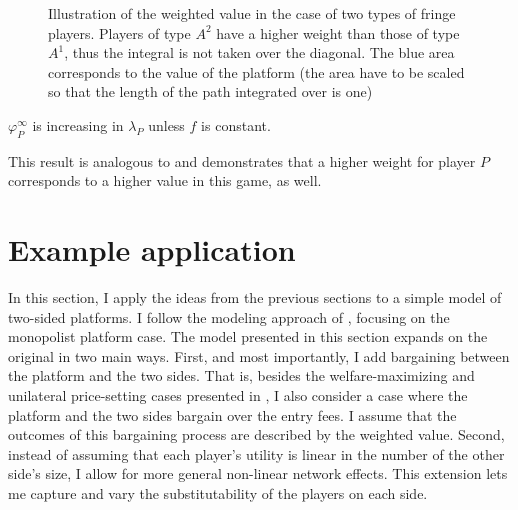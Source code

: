 \begin{figure}
    \centering
    \caption{Illustration of the weighted value in the case of two types of fringe players. Players of type $A^2$ have a higher weight than those of type $A^1$, thus the integral is not taken over the diagonal. The blue area corresponds to the value of the platform (the area have to be scaled so that the length of the path integrated over is one)}
    \label{fig:many_sided_weighted}
\end{figure}

\begin{corollary}
    \label{cor:platform_value_multiple_sides_weighted}
    $\varphi_P^\infty$ is increasing in $\lambda_P$ unless $f$ is constant.
\end{corollary}
This result is analogous to  and demonstrates that a higher weight for player $P$ corresponds to a higher value in this game, as well.

\section{Example application}
\label{sec:application}

In this section, I apply the ideas from the previous sections to a simple model of two-sided platforms.
I follow the modeling approach of \textcite{armstrong2006competition}, focusing on the monopolist platform case.
The model presented in this section expands on the original in two main ways.
First, and most importantly, I add bargaining between the platform and the two sides.
That is, besides the welfare-maximizing and unilateral price-setting cases presented in \textcite{armstrong2006competition}, I also consider a case where the platform and the two sides bargain over the entry fees.
I assume that the outcomes of this bargaining process are described by the weighted value.
Second, instead of assuming that each player's utility is linear in the number of the other side's size, I allow for more general non-linear network effects. 
This extension lets me capture and vary the substitutability of the players on each side.

